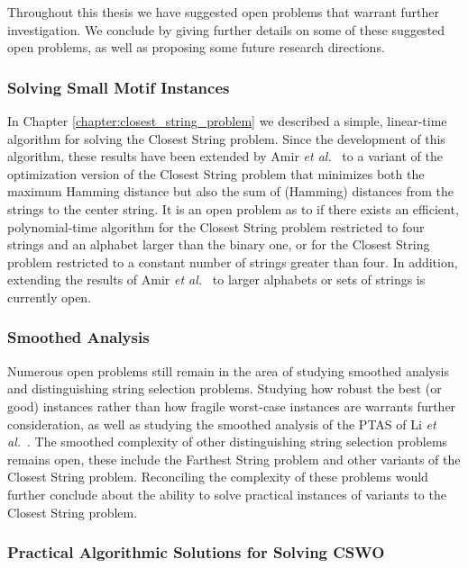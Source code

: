 Throughout this thesis we have suggested open problems that warrant further investigation.   We conclude by giving further details on some of these suggested open problems, as well as proposing some future research directions.

\subsubsection{Solving Small Motif Instances}

In Chapter \ref{chapter:closest_string_problem} we described a simple, linear-time algorithm for solving the {\sc Closest String} problem.  Since the development of this algorithm, these results have been extended by Amir {\em et al.}\ \cite{amir} to a variant of the optimization version of the {\sc Closest String} problem that minimizes both the maximum Hamming distance but also the sum of (Hamming) distances from the strings to the center string. It is an open problem as to if there exists an efficient, polynomial-time algorithm for the {\sc Closest String} problem restricted to four strings and an alphabet larger than the binary one, or for the {\sc Closest String} problem restricted to a constant number of strings greater than four.  In addition, extending the results of Amir {\em et al.}\ \cite{amir} to larger alphabets or sets of strings is currently open.

\subsubsection{Smoothed Analysis}

Numerous open problems still remain in the area of studying smoothed analysis and distinguishing string selection problems. Studying how robust the best (or good) instances rather than how fragile worst-case instances are warrants further consideration, as well as studying the smoothed analysis of the PTAS of Li {\em et al.}\ \cite{LMW02}.  The smoothed complexity of other distinguishing string selection problems remains open, these include the {\sc Farthest String} problem and other variants of the {\sc Closest String} problem.  Reconciling the complexity of these problems would further conclude about the ability to solve practical instances of variants to the {\sc Closest String} problem.

\subsubsection{Practical Algorithmic Solutions for Solving CSWO}


